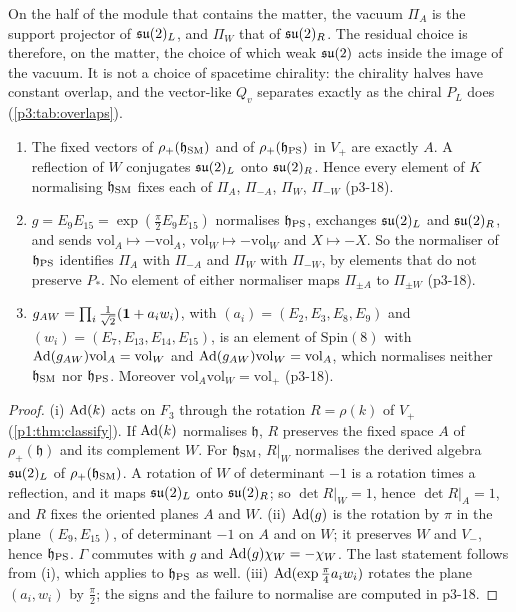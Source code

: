 On the half of the module that contains the matter, the vacuum $\Pi_A$ is the support projector of $\mathfrak{su}(2)_L$, and $\Pi_W$ that of $\mathfrak{su}(2)_R$. The residual choice is
therefore, on the matter, the choice of which weak $\mathfrak{su}(2)$ acts inside the image of the vacuum. It is not a choice of spacetime chirality: the chirality halves have
constant overlap, and the vector-like $Q_v$ separates exactly as the chiral $P_L$ does (\cref{p3:tab:overlaps}).

\begin{proposition}
\label{p3:prop:normaliser}
\begin{enumerate}[label=(\roman*),leftmargin=2.2em]
\item The fixed vectors of $\rho_+(\mathfrak h_{\rm SM})$ and of $\rho_+(\mathfrak h_{\rm PS})$ in $V_+$ are exactly $A$. A reflection of $W$ conjugates $\mathfrak{su}(2)_L$ onto $\mathfrak{su}(2)_R$.
Hence every element of $K$ normalising $\mathfrak h_{\rm SM}$ fixes each of $\Pi_A$, $\Pi_{-A}$, $\Pi_W$, $\Pi_{-W}$ (p3-18).
\item $g=E_9E_{15}=\exp(\tfrac\pi2E_9E_{15})$ normalises $\mathfrak h_{\rm PS}$, exchanges $\mathfrak{su}(2)_L$ and $\mathfrak{su}(2)_R$, and sends $\mathrm{vol}_A\mapsto-\mathrm{vol}_A$,
$\mathrm{vol}_W\mapsto-\mathrm{vol}_W$ and $X\mapsto-X$. So the normaliser of $\mathfrak h_{\rm PS}$ identifies $\Pi_A$ with $\Pi_{-A}$ and $\Pi_W$ with $\Pi_{-W}$, by
elements that do not preserve $P_*$. No element of either normaliser maps $\Pi_{\pm A}$ to $\Pi_{\pm W}$ (p3-18).
\item $g_{AW}=\prod_i\tfrac1{\sqrt2}(\mathbf 1+a_iw_i)$, with $(a_i)=(E_2,E_3,E_8,E_9)$ and $(w_i)=(E_7,E_{13},E_{14},E_{15})$, is an element of $\mathrm{Spin}(8)$ with
$\operatorname{Ad}(g_{AW})\mathrm{vol}_A=\mathrm{vol}_W$ and $\operatorname{Ad}(g_{AW})\mathrm{vol}_W=\mathrm{vol}_A$, which normalises neither $\mathfrak h_{\rm SM}$ nor $\mathfrak h_{\rm PS}$. Moreover
$\mathrm{vol}_A\mathrm{vol}_W=\mathrm{vol}_+$ (p3-18).
\end{enumerate}
\end{proposition}

\begin{proof}
(i) $\operatorname{Ad}(k)$ acts on $F_3$ through the rotation $R=\rho(k)$ of $V_+$ (\cref{p1:thm:classify}). If $\operatorname{Ad}(k)$ normalises $\mathfrak h$, $R$ preserves the fixed space $A$ of
$\rho_+(\mathfrak h)$ and its complement $W$. For $\mathfrak h_{\rm SM}$, $R|_W$ normalises the derived algebra $\mathfrak{su}(2)_L$ of $\rho_+(\mathfrak h_{\rm SM})$. A rotation of $W$ of
determinant $-1$ is a rotation times a reflection, and it maps $\mathfrak{su}(2)_L$ onto $\mathfrak{su}(2)_R$; so $\det R|_W=1$, hence $\det R|_A=1$, and $R$ fixes the oriented planes $A$ and $W$. (ii)
$\operatorname{Ad}(g)$ is the rotation by $\pi$ in the plane $(E_9,E_{15})$, of determinant $-1$ on $A$ and on $W$; it preserves $W$ and $V_-$, hence $\mathfrak h_{\rm PS}$. $\Gamma$ commutes
with $g$ and $\operatorname{Ad}(g)\chi_W=-\chi_W$. The last statement follows from (i), which applies to $\mathfrak h_{\rm PS}$ as well. (iii) $\operatorname{Ad}(\exp\tfrac\pi4a_iw_i)$ rotates the plane
$(a_i,w_i)$ by $\tfrac\pi2$; the signs and the failure to normalise are computed in p3-18.
\end{proof}

